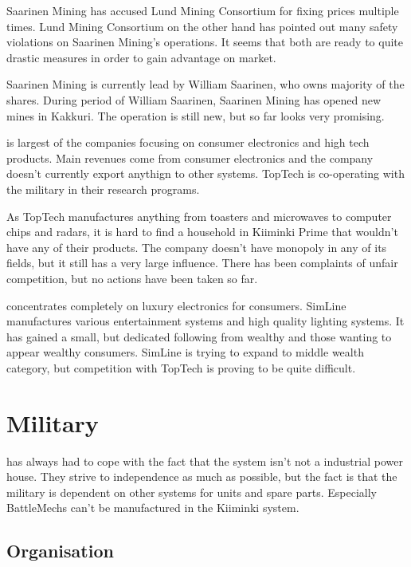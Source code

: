 \documentclass{tufte-book}
\begin{document}
Saarinen Mining has accused Lund Mining Consortium for fixing prices multiple
times. Lund Mining Consortium on the other hand has pointed out many safety
violations on Saarinen Mining's operations. It seems that both are ready to
quite drastic measures in order to gain advantage on market.

Saarinen Mining is currently lead by William Saarinen, who owns majority of
the shares. During period of William Saarinen, Saarinen Mining has opened new
mines in Kakkuri. The operation is still new, but so far looks very promising.

 is largest of the companies focusing on consumer
electronics and high tech products. Main revenues come from consumer
electronics and the company doesn't currently export anythign to other
systems. TopTech is co-operating with the military in their research
programs.

As TopTech manufactures anything from toasters and microwaves to computer
chips and radars, it is hard to find a household in Kiiminki Prime that
wouldn't have any of their products. The company doesn't have monopoly in any
of its fields, but it still has a very large influence. There has been
complaints of unfair competition, but no actions have been taken so far.

 concentrates completely on luxury electronics
for consumers. SimLine manufactures various entertainment systems and high
quality lighting systems. It has gained a small, but dedicated following from
wealthy and those wanting to appear wealthy consumers. SimLine is trying to
expand to middle wealth category, but competition with TopTech is proving to
be quite difficult.


\chapter{Military}
\label{ch:military}

 has always had to cope with the fact
that the system isn't not a industrial power house. They strive to
independence as much as possible, but the fact is that the military
is dependent on other systems for units and spare parts. Especially
BattleMechs can't be manufactured in the Kiiminki system.

\section{Organisation}
\label{sc:organisation}
\end{document}

